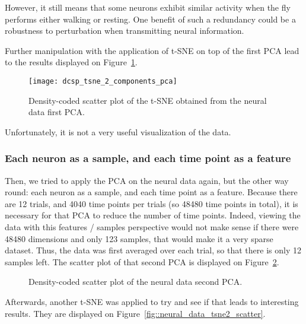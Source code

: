 However, it still means that some neurons exhibit similar activity when the fly performs either walking or resting.
One benefit of such a redundancy could be a robustness to perturbation when transmitting neural information.

\vspace{\baselineskip}
 
Further manipulation with the application of t-SNE on top of the first PCA lead to the results displayed on Figure~\ref{fig::neural_data_tsne1_scatter}.

\begin{figure}[htbp]
	\begin{center}
		\texttt{[image: dcsp\_tsne\_2\_components\_pca]}
		\caption{Density-coded scatter plot of the t-SNE obtained from the neural data first PCA.}
		\label{fig::neural_data_tsne1_scatter}
	\end{center}
\end{figure}

Unfortunately, it is not a very useful visualization of the data.

\subsubsection{Each neuron as a sample, and each time point as a feature}

Then, we tried to apply the PCA on the neural data again, but the other way round: each neuron as a sample, and each time point as a feature.
Because there are 12 trials, and 4040 time points per trials (so 48480 time points in total), it is necessary for that PCA to reduce the number of time points.
Indeed, viewing the data with this features / samples perspective would not make sense if there were 48480 dimensions and only 123 samples, that would make it a very sparse dataset.
Thus, the data was first averaged over each trial, so that there is only 12 samples left.
The scatter plot of that second PCA is displayed on Figure~\ref{fig::neural_data_pca2_scatter}.

\begin{figure}[htbp]
	\begin{center}
		
		\caption{Density-coded scatter plot of the neural data second PCA.}
		\label{fig::neural_data_pca2_scatter}
	\end{center}
\end{figure}

Afterwards, another t-SNE was applied to try and see if that leads to interesting results.
They are displayed on Figure~\ref{fig::neural_data_tsne2_scatter}.

